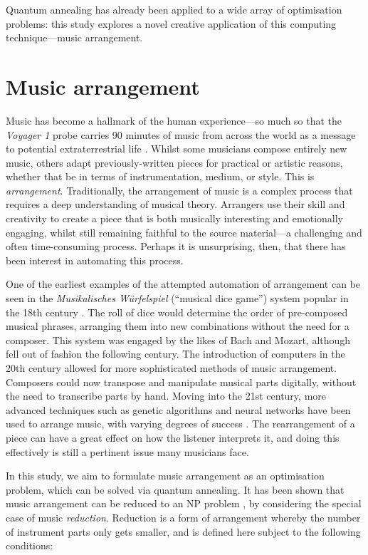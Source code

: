 \documentclass[twocolumn]{article}
\theoremstyle{definition}
\begin{document}
Quantum annealing has already been applied to a wide array of optimisation problems: this study explores a novel creative application of this computing technique---music arrangement.

\section*{Music arrangement}
\label{sec:arrangement}

Music has become a hallmark of the human experience---so much so that the \textit{Voyager 1} probe carries 90 minutes of music from across the world as a message to potential extraterrestrial life \cite{nasa_golden_2024}. Whilst some musicians compose entirely new music, others adapt previously-written pieces for practical or artistic reasons, whether that be in terms of instrumentation, medium, or style. This is \emph{arrangement}.
Traditionally, the arrangement of music is a complex process that requires a deep understanding of musical theory. Arrangers use their skill and creativity to create a piece that is both musically interesting and emotionally engaging, whilst still remaining faithful to the source material---a challenging and often time-consuming process. Perhaps it is unsurprising, then, that there has been interest in automating this process.

One of the earliest examples of the attempted automation of arrangement can be seen in the \textit{Musikalisches Würfelspiel} (``musical dice game'') system popular in the 18th century \cite{nierhaus_algorithmic_2009}. The roll of dice would determine the order of pre-composed musical phrases, arranging them into new combinations without the need for a composer. This system was engaged by the likes of Bach and Mozart, although fell out of fashion the following century.
The introduction of computers in the 20th century allowed for more sophisticated methods of music arrangement. Composers could now transpose and manipulate musical parts digitally, without the need to transcribe parts by hand. Moving into the 21st century, more advanced techniques such as genetic algorithms and neural networks have been used to arrange music, with varying degrees of success \cite{nierhaus_algorithmic_2009}. The rearrangement of a piece can have a great effect on how the listener interprets it, and doing this effectively is still a pertinent issue many musicians face. 

In this study, we aim to formulate music arrangement as an optimisation problem, which can be solved via quantum annealing. It has been shown that music arrangement can be reduced to an NP problem \cite{moses_computational_2016}, by considering the special case of music \emph{reduction}. Reduction is a form of arrangement whereby the number of instrument parts only gets smaller, and is defined here subject to the following conditions:
\end{document}

